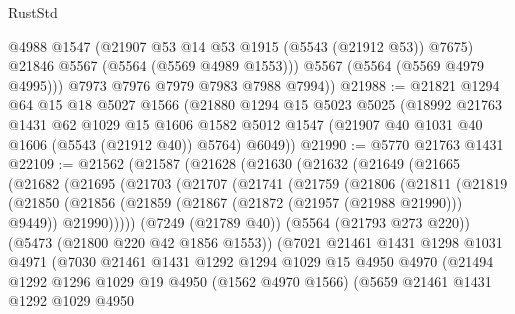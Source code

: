 \begin{lexlean}{RustStd}
\begin{coremodule}
            @4988
            @1547
            (@21907 @53 @14 @53 @1915 (@5543 (@21912 @53)) @7675)
            @21846
            @5567
            (@5564 (@5569 @4989 @1553)))
          @5567
          (@5564 (@5569 @4979 @4995)))
        @7973
        @7976
        @7979
        @7983
        @7988
        @7994))
@21988 := @21821
    @1294
    @64
    @15
    @18
    @5027
    @1566
    (@21880
      @1294
      @15
      @5023
      @5025
      (@18992
        @21763
        @1431
        @62
        @1029
        @15
        @1606
        @1582
        @5012
        @1547
        (@21907 @40 @1031 @40 @1606 (@5543 (@21912 @40)) @5764)
        @6049))
@21990 := @5770 @21763 @1431
@22109 := @21562
    (@21587
      (@21628
        (@21630
          (@21632
            (@21649
              (@21665
                (@21682
                  (@21695
                    (@21703
                      (@21707
                        (@21741
                          (@21759
                            (@21806
                              (@21811
                                (@21819
                                  (@21850
                                    (@21856
                                      (@21859 (@21867 (@21872 (@21957 (@21988 @21990))) @9449))
                                      @21990)))))
                            (@7249 (@21789 @40))
                            (@5564 (@21793 @273 @220))
                            (@5473 (@21800 @220 @42 @1856 @1553))
                            (@7021
                              @21461
                              @1431
                              @1298
                              @1031
                              @4971
                              (@7030
                                @21461
                                @1431
                                @1292
                                @1294
                                @1029
                                @15
                                @4950
                                @4970
                                (@21494
                                  @1292
                                  @1296
                                  @1029
                                  @19
                                  @4950
                                  (@1562 @4970 @1566)
                                  (@5659
                                    @21461
                                    @1431
                                    @1292
                                    @1029
                                    @4950

\end{coremodule}
\end{lexlean}

